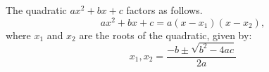 \begin{frame}
\begin{theorem}
The quadratic $ax^2+bx+c$ factors as follows.
\[
ax^2+bx+c=a(x-x_1)(x-x_2),
\]
where $x_1$ and $x_2$ are the roots of the quadratic, given by: 
\[
x_1, x_2=\frac{-b\pm \sqrt{b^2-4ac}}{2a}
\]
\end{theorem}
\end{frame}